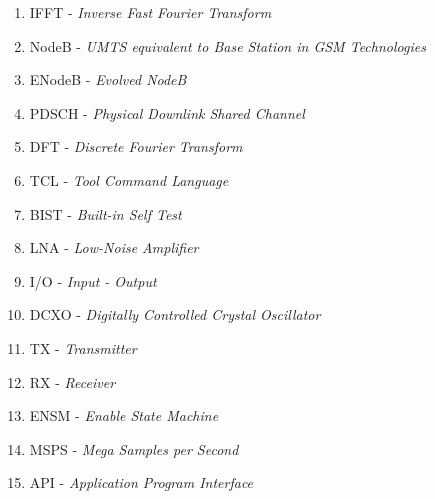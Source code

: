 \begin{enumerate}
	\item IFFT - \textit{Inverse Fast Fourier Transform}
	\item NodeB - \textit{UMTS equivalent to Base Station in GSM Technologies}
	\item ENodeB - \textit{Evolved NodeB}
	\item PDSCH - \textit{Physical Downlink Shared Channel}
	\item DFT - \textit{Discrete Fourier Transform}
	\item TCL - \textit{Tool Command Language}
	\item BIST - \textit{Built-in Self Test}
	\item LNA - \textit{Low-Noise Amplifier}
	\item I/O - \textit{Input - Output}
	\item DCXO - \textit{Digitally Controlled Crystal Oscillator}
	\item TX - \textit{Transmitter}
	\item RX - \textit{Receiver}
	\item ENSM - \textit{Enable State Machine}
	\item MSPS - \textit{Mega Samples per Second}
	\item API - \textit{Application Program Interface}
\end{enumerate}
